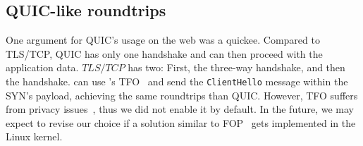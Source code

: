 \subsection{QUIC-like roundtrips}

One argument for QUIC's usage on the web was a quickee.
Compared to TLS/TCP, QUIC has only one handshake and can then proceed with the
application data. $TLS/TCP$ has two: First, the \tcp three-way handshake, and
then the \tls handshake. \tcpls can use \tcp's TFO~\cite{radhakrishnan2011tcp}
and send the \texttt{ClientHello} message within the \tcp SYN's payload,
achieving the same roundtrips than QUIC. However, TFO suffers from privacy
issues~\cite{sy2020enhanced}, thus we did not enable it by default. In the
future, we may expect to revise our choice if a solution similar to \tcp
FOP~\cite{sy2020enhanced} gets implemented in the Linux kernel.


